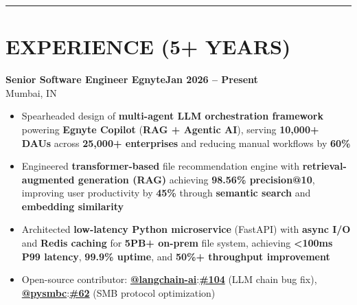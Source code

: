 \documentclass[10pt,a4paper]{article}
\begin{document}
\vspace{2pt}
\noindent\rule{\textwidth}{0.8pt}

\section*{EXPERIENCE (5+ YEARS)}

{\small
\noindent
\textbf{Senior Software Engineer \textbf{\textbar{}} Egnyte}\hfill\textbf{Jan 2026 -- Present}\\[-2pt]
{\small Mumbai, IN}
\begin{itemize}[leftmargin=0.3in, itemsep=1.5pt, topsep=0pt, parsep=0pt, partopsep=0pt, label=$\circ$]
    \item Spearheaded design of \textbf{multi-agent LLM orchestration framework} powering \textbf{Egnyte Copilot} (\textbf{RAG + Agentic AI}), serving \textbf{10,000+ DAUs} across \textbf{25,000+ enterprises} and reducing manual workflows by \textbf{60\%}
    \item Engineered \textbf{transformer-based} file recommendation engine with \textbf{retrieval-augmented generation (RAG)} achieving \textbf{98.56\% precision@10}, improving user productivity by \textbf{45\%} through \textbf{semantic search} and \textbf{embedding similarity}
    \item Architected \textbf{low-latency Python microservice} (FastAPI) with \textbf{async I/O} and \textbf{Redis caching} for \textbf{5PB+ on-prem} file system, achieving \textbf{<100ms P99 latency}, \textbf{99.9\% uptime}, and \textbf{50\%+ throughput improvement}
    \item Open-source contributor: \href{https://pypi.org/project/langchain-community/}{\textbf{@langchain-ai}}:\href{https://github.com/langchain-ai/langchain-community/pull/104}{\textbf{\#104}} (LLM chain bug fix), \href{https://pypi.org/project/pysmbc/}{\textbf{@pysmbc}}:\href{https://github.com/hamano/pysmbc/pull/62}{\textbf{\#62}} (SMB protocol optimization)
\end{itemize}

}
\end{document}
